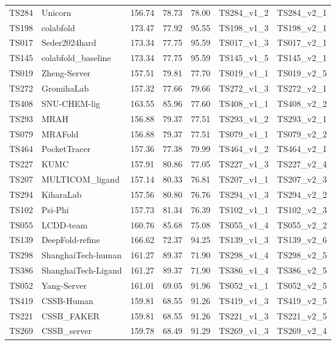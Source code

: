 \begin{longtable}{lllllll}
TS284 & Unicorn & 156.74 & 78.73 & 78.00 & TS284\_v1\_2 & TS284\_v2\_1 \\ 
TS198 & colabfold & 173.47 & 77.92 & 95.55 & TS198\_v1\_3 & TS198\_v2\_1 \\ 
TS017 & Seder2024hard & 173.34 & 77.75 & 95.59 & TS017\_v1\_3 & TS017\_v2\_1 \\ 
TS145 & colabfold\_baseline & 173.34 & 77.75 & 95.59 & TS145\_v1\_5 & TS145\_v2\_1 \\ 
TS019 & Zheng-Server & 157.51 & 79.81 & 77.70 & TS019\_v1\_1 & TS019\_v2\_5 \\ 
TS272 & GromihaLab & 157.32 & 77.66 & 79.66 & TS272\_v1\_3 & TS272\_v2\_1 \\ 
TS408 & SNU-CHEM-lig & 163.55 & 85.96 & 77.60 & TS408\_v1\_1 & TS408\_v2\_2 \\ 
TS293 & MRAH & 156.88 & 79.37 & 77.51 & TS293\_v1\_2 & TS293\_v2\_1 \\ 
TS079 & MRAFold & 156.88 & 79.37 & 77.51 & TS079\_v1\_1 & TS079\_v2\_2 \\ 
TS464 & PocketTracer & 157.36 & 77.38 & 79.99 & TS464\_v1\_2 & TS464\_v2\_1 \\ 
TS227 & KUMC & 157.91 & 80.86 & 77.05 & TS227\_v1\_3 & TS227\_v2\_4 \\ 
TS207 & MULTICOM\_ligand & 157.14 & 80.33 & 76.81 & TS207\_v1\_1 & TS207\_v2\_3 \\ 
TS294 & KiharaLab & 157.56 & 80.80 & 76.76 & TS294\_v1\_3 & TS294\_v2\_2 \\ 
TS102 & Psi-Phi & 157.73 & 81.34 & 76.39 & TS102\_v1\_1 & TS102\_v2\_3 \\ 
TS055 & LCDD-team & 160.76 & 85.68 & 75.08 & TS055\_v1\_4 & TS055\_v2\_2 \\ 
TS139 & DeepFold-refine & 166.62 & 72.37 & 94.25 & TS139\_v1\_3 & TS139\_v2\_6 \\ 
TS298 & ShanghaiTech-human & 161.27 & 89.37 & 71.90 & TS298\_v1\_4 & TS298\_v2\_5 \\ 
TS386 & ShanghaiTech-Ligand & 161.27 & 89.37 & 71.90 & TS386\_v1\_4 & TS386\_v2\_5 \\ 
TS052 & Yang-Server & 161.01 & 69.05 & 91.96 & TS052\_v1\_1 & TS052\_v2\_5 \\ 
TS419 & CSSB-Human & 159.81 & 68.55 & 91.26 & TS419\_v1\_3 & TS419\_v2\_5 \\ 
TS221 & CSSB\_FAKER & 159.81 & 68.55 & 91.26 & TS221\_v1\_3 & TS221\_v2\_5 \\ 
TS269 & CSSB\_server & 159.78 & 68.49 & 91.29 & TS269\_v1\_3 & TS269\_v2\_4 \\ 

\end{longtable}
